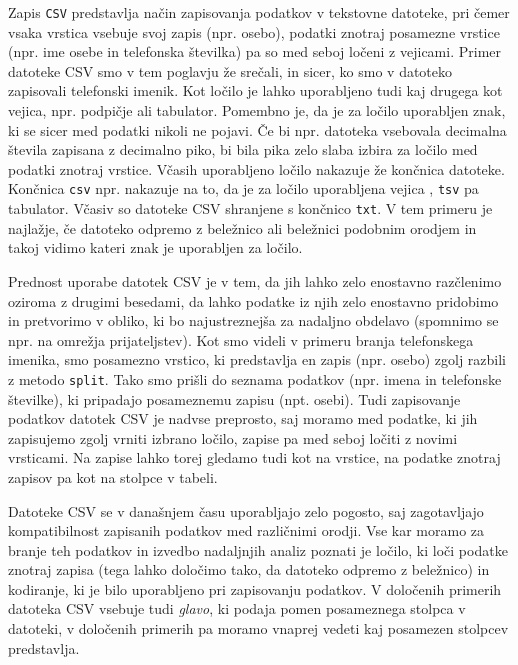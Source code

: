 Zapis \texttt{CSV}  predstavlja način zapisovanja podatkov v tekstovne datoteke, pri čemer vsaka vrstica vsebuje svoj zapis (npr. osebo), podatki znotraj posamezne vrstice (npr. ime osebe in telefonska številka) pa so med seboj ločeni z vejicami. Primer datoteke CSV smo v tem poglavju že srečali, in sicer, ko smo v datoteko zapisovali telefonski imenik. Kot ločilo je lahko uporabljeno tudi kaj drugega kot vejica, npr. podpičje ali tabulator. Pomembno je, da je za ločilo uporabljen znak, ki se sicer med podatki nikoli ne pojavi. Če bi npr. datoteka vsebovala decimalna števila zapisana z decimalno piko, bi bila pika zelo slaba izbira za ločilo med podatki znotraj vrstice. Včasih uporabljeno ločilo nakazuje že končnica datoteke. Končnica \texttt{csv} npr. nakazuje na to, da je za ločilo uporabljena vejica , \texttt{tsv} pa tabulator. Včasiv so datoteke CSV shranjene s končnico \texttt{txt}. V tem primeru je najlažje, če datoteko odpremo z beležnico ali beležnici podobnim orodjem in takoj vidimo kateri znak je uporabljen za ločilo. 

Prednost uporabe datotek CSV je v tem, da jih lahko zelo enostavno razčlenimo  oziroma z drugimi besedami, da lahko podatke iz njih zelo enostavno pridobimo in pretvorimo v obliko, ki bo najustreznejša za nadaljno obdelavo (spomnimo se npr. na omrežja prijateljstev). Kot smo videli v primeru branja telefonskega imenika, smo posamezno vrstico, ki predstavlja en zapis (npr. osebo) zgolj razbili z metodo \texttt{split}. Tako smo prišli do seznama podatkov (npr. imena in telefonske številke), ki pripadajo posameznemu zapisu (npt. osebi). Tudi zapisovanje podatkov datotek CSV je nadvse preprosto, saj moramo med podatke, ki jih zapisujemo zgolj vrniti izbrano ločilo, zapise pa med seboj ločiti z novimi vrsticami. Na zapise lahko torej gledamo tudi kot na vrstice, na podatke znotraj zapisov pa kot na stolpce v tabeli. 

Datoteke CSV se v današnjem času uporabljajo zelo pogosto, saj zagotavljajo kompatibilnost zapisanih podatkov med različnimi orodji. Vse kar moramo za branje teh podatkov in izvedbo nadaljnjih analiz poznati je ločilo, ki loči podatke znotraj zapisa (tega lahko določimo tako, da datoteko odpremo z beležnico) in kodiranje, ki je bilo uporabljeno pri zapisovanju podatkov. V določenih primerih datoteka CSV vsebuje tudi \emph{glavo}, ki podaja pomen posameznega stolpca v datoteki, v določenih primerih pa moramo vnaprej vedeti kaj posamezen stolpcev predstavlja. 

